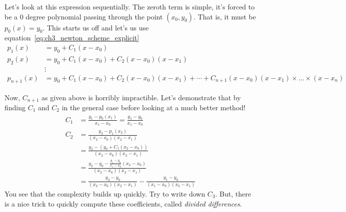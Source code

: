 Let's look at this expression sequentially. The zeroth term is simple, it's forced to be a 0 degree polynomial passing through the point $(x_0,y_0)$. That is, it must be $p_0(x)=y_0$. This starts us off and let's us use equation~\ref{eq:ch3_newton_scheme_explicit}
\begin{align*}
p_1(x) &= y_0 + C_1(x-x_0) \\
%
p_2(x) &= y_0 + C_1(x-x_0) + C_2(x-x_0)(x-x_1) \\
%
&\vdots \\
%
p_{n+1}(x) &= y_0 + C_1(x-x_0) + C_2(x-x_0)(x-x_1) + \cdots +  C_{n+1}(x-x_0)(x-x_1)\times \dots \times (x-x_n)
\end{align*}

Now, $C_{n+1}$ as given above is horribly impractible. Let's demonstrate that by finding $C_1$ and $C_2$ in the general case before looking at a much better method!
\begin{align*}
C_1 &= \frac{y_1 - p_0(x_1)}{x_1-x_0} = \frac{y_1 - y_0}{x_1-x_0} \\
C_2 &= \frac{y_2 - p_1(x_2)}{(x_2-x_0)(x_2-x_1)} \\
%
&= \frac{y_2 - (y_0 + C_1(x_2-x_0))}{(x_2-x_0)(x_2-x_1)} \\
%
&= \frac{y_2 - y_0 - \frac{y_1 - y_0}{x_1-x_0}(x_2-x_0)}{(x_2-x_0)(x_2-x_1)} \\
%
&= \frac{y_2 - y_0}{(x_2-x_0)(x_2-x_1)} - \frac{y_1 - y_0}{(x_1-x_0)(x_2-x_1)}
%
\end{align*}
You see that the complexity builds up quickly. Try to write down $C_3$. But, there is a nice trick to quickly compute these coefficients, called \textit{divided differences}.

